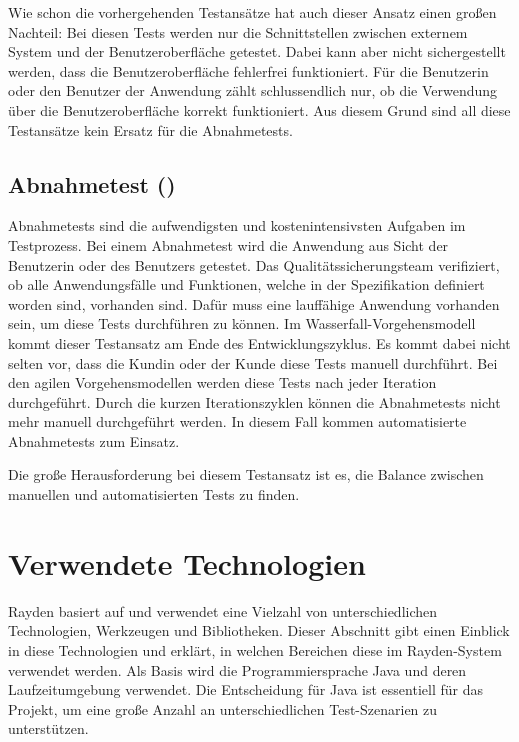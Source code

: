 \SuperPar
Wie schon die vorhergehenden Testansätze hat auch dieser Ansatz einen großen Nachteil: Bei diesen Tests werden nur die Schnittstellen zwischen externem System und der Benutzeroberfläche getestet. Dabei kann aber nicht sichergestellt werden, dass die Benutzeroberfläche fehlerfrei funktioniert. Für die Benutzerin oder den Benutzer der Anwendung zählt schlussendlich nur, ob die Verwendung über die Benutzeroberfläche korrekt funktioniert. Aus diesem Grund sind all diese Testansätze kein Ersatz für die Abnahmetests.

\subsection{Abnahmetest ()}

Abnahmetests sind die aufwendigsten und kostenintensivsten Aufgaben im Testprozess. Bei einem Abnahmetest wird die Anwendung aus Sicht der Benutzerin oder des Benutzers getestet. Das Qualitätssicherungsteam verifiziert, ob alle Anwendungsfälle und Funktionen, welche in der Spezifikation definiert worden sind, vorhanden sind. Dafür muss eine lauffähige Anwendung vorhanden sein, um diese Tests durchführen zu können. Im Wasserfall-Vorgehensmodell kommt dieser Testansatz am Ende des Entwicklungszyklus. Es kommt dabei nicht selten vor, dass die Kundin oder der Kunde diese Tests manuell durchführt. Bei den agilen Vorgehensmodellen werden diese Tests nach jeder Iteration durchgeführt. Durch die kurzen Iterationszyklen können die Abnahmetests nicht mehr manuell durchgeführt werden. In diesem Fall kommen automatisierte Abnahmetests zum Einsatz. 

\SuperPar
Die große Herausforderung bei diesem Testansatz ist es, die Balance zwischen manuellen und automatisierten Tests zu finden.

\section{Verwendete Technologien}

Rayden basiert auf und verwendet eine Vielzahl von unterschiedlichen Technologien, Werkzeugen und Bibliotheken. Dieser Abschnitt gibt einen Einblick in diese Technologien und erklärt, in welchen Bereichen diese im Rayden-System verwendet werden. Als Basis wird die Programmiersprache Java und deren Laufzeitumgebung verwendet. Die Entscheidung für Java ist essentiell für das Projekt, um eine große Anzahl an unterschiedlichen Test-Szenarien zu unterstützen. 


